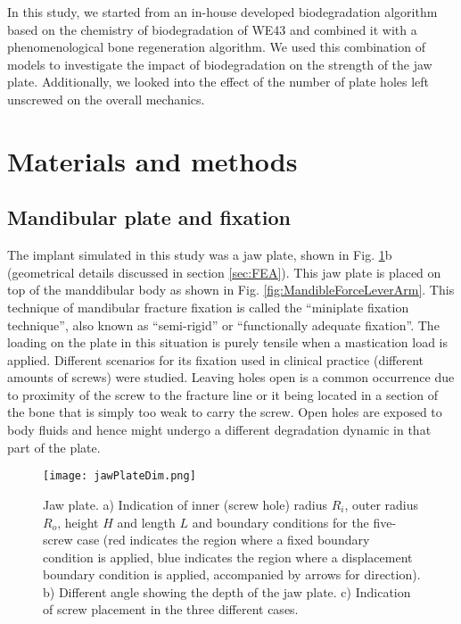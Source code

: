 In this study, we started from an in-house developed biodegradation algorithm based on the chemistry of biodegradation of WE43 and combined it with a phenomenological bone regeneration algorithm. We used this combination of models to investigate the impact of biodegradation on the strength of the jaw plate. Additionally, we looked into the effect of the number of plate holes left unscrewed on the overall mechanics.


\section{Materials and methods}

\subsection{Mandibular plate and fixation}

The implant simulated in this study was a jaw plate, shown in Fig. \ref{fig:jawPlateDim}b (geometrical details discussed in section \ref{sec:FEA}). This jaw plate is placed on top of the manddibular body as shown in Fig. \ref{fig:MandibleForceLeverArm}. This technique of mandibular fracture fixation is called the ``miniplate fixation technique'', also known as ``semi-rigid'' or ``functionally adequate fixation''. The loading on the plate in this situation is purely tensile when a mastication load is applied. Different scenarios for its fixation used in clinical practice (different amounts of screws) were studied. Leaving holes open is a common occurrence due to proximity of the screw to the fracture line or it being located in a section of the bone that is simply too weak to carry the screw. Open holes are exposed to body fluids and hence might undergo a different degradation dynamic in that part of the plate.

\begin{figure}[h]
    \centering
    \medskip
    \texttt{[image: jawPlateDim.png]}
    \caption[Indication of dimensions and screws placement on the jaw plate]{Jaw plate. a) Indication of inner (screw hole) radius $R_i$, outer radius $R_o$, height $H$ and length $L$ and boundary conditions for the five-screw case (red indicates the region where a fixed boundary condition is applied, blue indicates the region where a displacement boundary condition is applied, accompanied by arrows for direction). b) Different angle showing the depth of the jaw plate. c) Indication of screw placement in the three different cases.}
    \label{fig:jawPlateDim}
\end{figure}


